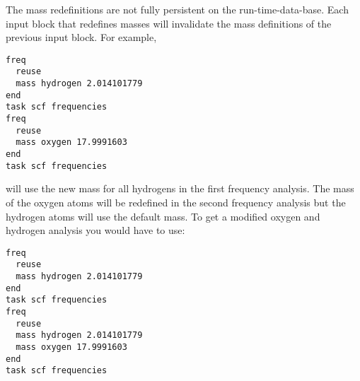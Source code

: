 The mass redefinitions are not fully persistent on the
run-time-data-base.  Each input block that redefines masses will
invalidate the mass definitions of the previous input block.
For example, 
\begin{verbatim}
freq
  reuse
  mass hydrogen 2.014101779
end
task scf frequencies
freq
  reuse
  mass oxygen 17.9991603
end
task scf frequencies
\end{verbatim}
will use the new mass for all hydrogens in the first frequency
analysis.  The mass of the oxygen atoms will be redefined in the second
frequency analysis but the hydrogen atoms will use the default mass.
To get a modified oxygen and hydrogen analysis you would have to use:
\begin{verbatim}
freq
  reuse
  mass hydrogen 2.014101779
end
task scf frequencies
freq
  reuse
  mass hydrogen 2.014101779
  mass oxygen 17.9991603
end
task scf frequencies
\end{verbatim}

